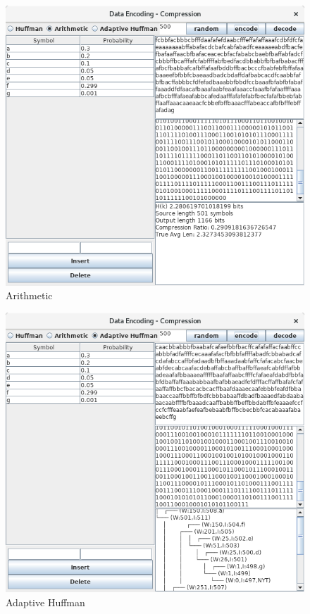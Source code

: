 \documentclass{article}
\begin{document}
\begin{figure}
  \includegraphics[scale=0.3]{images/gui_c.png}
  \caption{Arithmetic}
  \label{fig:gui_arithetmetic}
\end{figure}

\begin{figure}
  \includegraphics[scale=0.3]{images/gui_d.png}
  \caption{Adaptive Huffman}
  \label{fig:gui_adaptive_huffman}
\end{figure}
\end{document}
